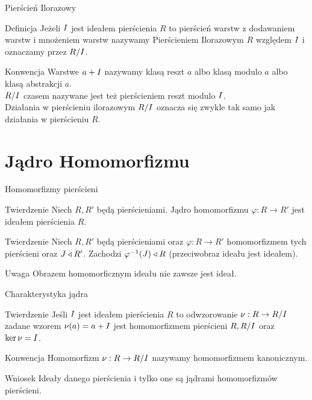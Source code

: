 \documentclass{beamer}
\newcommand{\II}{\mathnormal{I}}
\newcommand{\JJ}{\mathnormal{J}}
\let\phi\varphi
\begin{document}
\begin{frame}{Pierścień Ilorazowy}
    \begin{block}{Definicja}
        Jeżeli $\II$ jest ideałem pierścienia $R$ to pierścień warstw z dodawaniem warstw i mnożeniem warstw nazywamy \alert{Pierścieniem Ilorazowym} $R$ względem $\II$ i oznaczamy przez $R/\II$.
    \end{block}
    \pause 
    \begin{alertblock}{Konwencja}
        Warstwe $a + \II$ nazywamy klasą reszt $a$ albo klasą modulo $a$ albo klasą abstrakcji $a$. \\
        $R/\II$ czasem nazywane jest też pierścieniem reszt modulo $\II$. \\
        Działania w pierścieniu ilorazowym $R/\II$ oznacza się zwykle tak samo jak działania w pierścieniu $R$.
    \end{alertblock}
\end{frame}

\section{Jądro Homomorfizmu}
\begin{frame}{Homomorfizmy pierścieni}
    \begin{block}{Twierdzenie}
        Niech $R, R'$ będą pierścieniami. Jądro homomorfizmu $\phi : R \rightarrow R'$ jest ideałem pierścienia $R$.
    \end{block}
    \pause 
    \begin{block}{Twierdzenie}
        Niech $R, R'$ będą pierścieniami oraz $\phi : R \rightarrow R'$ homomorfizmem tych pierścieni oraz $\JJ \triangleleft R'$. Zachodzi $\phi^{-1}(\JJ) \triangleleft R$ (przeciwobraz ideału jest ideałem).
    \end{block}
    \pause
    \begin{alertblock}{Uwaga}
        Obrazem homomorficznym ideału \alert{nie zawsze} jest ideał.
    \end{alertblock}
\end{frame}

\begin{frame}{Charakterystyka jądra}
    \begin{block}{Twierdzenie}
        Jeśli $\II$ jest ideałem pierścienia $R$ to odwzorowanie $\nu : R \rightarrow R/\II$ zadane wzorem $\nu(a) = a + \II$ jest homomorfizmem pierścieni $R, R/\II$ oraz $\ker \nu = \II$. 
    \end{block}
    \pause
    \begin{alertblock}{Konwencja}
        Homomorfizm $\nu : R \rightarrow R/\II$ nazywamy homomorfizmem kanonicznym.
    \end{alertblock}
    \pause 
    \begin{alertblock}{Wniosek}
        Ideały danego pierścienia i tylko one są jądrami homomorfizmów pierścieni.
    \end{alertblock}
\end{frame}
\end{document}

